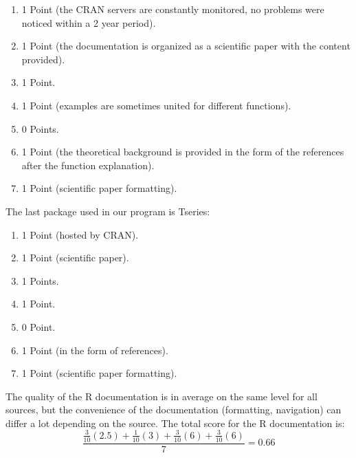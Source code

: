 \documentclass{article}
\begin{document}
\begin{enumerate}
    \item 1 Point (the CRAN servers are constantly monitored, no problems were noticed within a 2 year period).
    \item 1 Point (the documentation is organized as a scientific paper with the content provided).
    \item 1 Point.
    \item 1 Point (examples are sometimes united for different functions).
    \item 0 Points.
    \item 1 Point (the theoretical background is provided in the form of the references after the function explanation).
    \item 1 Point (scientific paper formatting).
\end{enumerate}
The last package used in our program is Tseries:
\begin{enumerate}
    \item 1 Point (hosted by CRAN).
    \item 1 Point (scientific paper).
    \item 1 Points.
    \item 1 Point.
    \item 0 Point.
    \item 1 Point (in the form of references).
    \item 1 Point (scientific paper formatting).
\end{enumerate}
The quality of the R documentation is in average on the same level for all sources, but the convenience of the documentation (formatting, navigation) can differ a lot depending on the source. The total score for the R documentation is:
\[ \frac{\frac{3}{10}(2.5)+\frac{1}{10}(3)+\frac{3}{10}(6)+\frac{3}{10}(6)}{7}= 0.66 \] 
\end{document}
